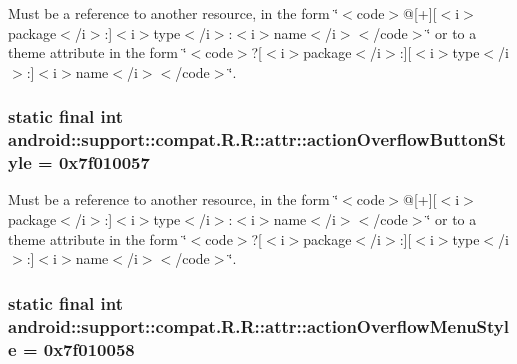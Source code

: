 Must be a reference to another resource, in the form \char`\"{}$<$code$>$@\mbox{[}+\mbox{]}\mbox{[}$<$i$>$package$<$/i$>$:\mbox{]}$<$i$>$type$<$/i$>$:$<$i$>$name$<$/i$>$$<$/code$>$\char`\"{} or to a theme attribute in the form \char`\"{}$<$code$>$?\mbox{[}$<$i$>$package$<$/i$>$:\mbox{]}\mbox{[}$<$i$>$type$<$/i$>$:\mbox{]}$<$i$>$name$<$/i$>$$<$/code$>$\char`\"{}. \hypertarget{classandroid_1_1support_1_1compat_1_1_r_1_1attr_5dfc389744db9cd41db5cd7ca06689c2}{
\subsubsection[{actionOverflowButtonStyle}]{\setlength{\rightskip}{0pt plus 5cm}static final int android::support::compat.R.R::attr::actionOverflowButtonStyle = 0x7f010057}}
\label{classandroid_1_1support_1_1compat_1_1_r_1_1attr_5dfc389744db9cd41db5cd7ca06689c2}


Must be a reference to another resource, in the form \char`\"{}$<$code$>$@\mbox{[}+\mbox{]}\mbox{[}$<$i$>$package$<$/i$>$:\mbox{]}$<$i$>$type$<$/i$>$:$<$i$>$name$<$/i$>$$<$/code$>$\char`\"{} or to a theme attribute in the form \char`\"{}$<$code$>$?\mbox{[}$<$i$>$package$<$/i$>$:\mbox{]}\mbox{[}$<$i$>$type$<$/i$>$:\mbox{]}$<$i$>$name$<$/i$>$$<$/code$>$\char`\"{}. \hypertarget{classandroid_1_1support_1_1compat_1_1_r_1_1attr_92fe4f70c8e63211b051e1f9d82153d4}{
\subsubsection[{actionOverflowMenuStyle}]{\setlength{\rightskip}{0pt plus 5cm}static final int android::support::compat.R.R::attr::actionOverflowMenuStyle = 0x7f010058}}
\label{classandroid_1_1support_1_1compat_1_1_r_1_1attr_92fe4f70c8e63211b051e1f9d82153d4}


